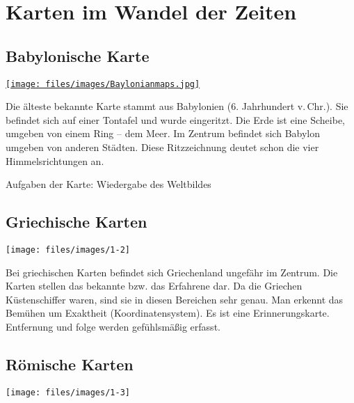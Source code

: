 \section{Karten im Wandel der Zeiten}

\subsection{Babylonische Karte}
\begin{minipage}{8cm}
	\href{http://en.wikipedia.org/wiki/File:Baylonianmaps.JPG}{
	\texttt{[image: files/images/Baylonianmaps.jpg]}}
\end{minipage}
\hfill
\begin{minipage}{8cm}
Die älteste bekannte Karte stammt aus Babylonien (6. Jahrhundert v.\,Chr.). Sie befindet sich auf einer Tontafel und wurde
eingeritzt. Die Erde ist eine Scheibe, umgeben von einem Ring -- dem Meer. Im Zentrum befindet sich Babylon umgeben von
anderen Städten. Diese Ritzzeichnung deutet schon die vier Himmelsrichtungen an.\\
\begin{list}{}{}\item[Aufgaben der Karte:]Wiedergabe des Weltbildes\end{list}
\end{minipage}

\subsection{Griechische Karten}
\begin{minipage}{8cm}
	\texttt{[image: files/images/1-2]}
\end{minipage}
\hfill
\begin{minipage}{8cm}
Bei griechischen Karten befindet sich Griechenland ungefähr im Zentrum.
Die Karten stellen das bekannte bzw. das Erfahrene dar.
Da die Griechen Küstenschiffer waren, sind sie in diesen Bereichen sehr genau.
Man erkennt das Bemühen um Exaktheit (Koordinatensystem).
Es ist eine Erinnerungskarte. Entfernung und folge werden gefühlsmäßig erfasst.
\end{minipage}

\subsection{Römische Karten}
\texttt{[image: files/images/1-3]}
\vspace{0.5cm}

